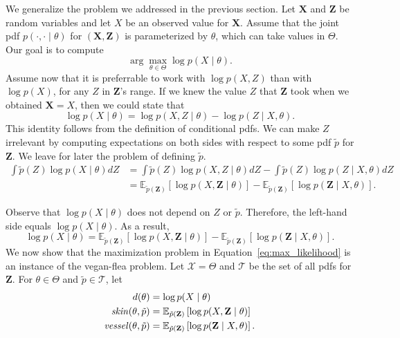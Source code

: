 We generalize the problem we addressed in the previous section. Let $\mathbf{X}$ and $\mathbf{Z}$ be random variables and let $X$ be an observed value for $\mathbf{X}$. Assume that the joint pdf $p(\cdot, \cdot \mid \theta)$ for $(\mathbf{X}, \mathbf{Z})$ is parameterized by $\theta$, which can take values in $\Theta$. Our goal is to compute
%
\begin{equation}
\arg\max_{\theta \in \Theta} \log p(X \mid \theta).
\label{eq:max_likelihood}
\end{equation}
%
Assume now that it is preferrable to work with $\log p\left(X, Z\right)$ than with $\log p(X)$, for any $Z$ in $\mathbf{Z}$'s range. If we knew the value $Z$ that $\mathbf{Z}$ took when we obtained $\mathbf{X} = X$, then we could state that
%
\begin{equation}
\log p(X \mid \theta) = \log p(X, Z \mid \theta) - \log p (Z \mid X, \theta).
\label{eq:connect}
\end{equation}
%
This identity follows from the definition of conditional pdfs. We can make $Z$ irrelevant by computing expectations on both sides with respect to some pdf $\tilde{p}$ for $\mathbf{Z}$. We leave for later the problem of defining $\tilde{p}$.
%
\begin{align*}
\int \tilde{p}(Z) \log p(X \mid \theta) dZ &= \int \tilde{p}(Z)\log p(X, Z \mid \theta) dZ - \int \tilde{p}(Z)\log p (Z \mid X, \theta) dZ\\[5pt]
&= \mathbb{E}_{\tilde{p}\left(\mathbf{Z}\right)}\left[\log p(X, \mathbf{Z} \mid \theta)\right] - \mathbb{E}_{\tilde{p}\left(\mathbf{Z}\right)}\left[\log p (\mathbf{Z} \mid X, \theta)\right].
\label{eq:log_connect} 
\end{align*}
%

Observe that $\log p(X \mid \theta)$ does not depend on $Z$ or $\tilde{p}$. Therefore, the left-hand side equals $\log p(X \mid \theta)$. As a result,
%
\begin{equation}
\log p(X \mid \theta) = \mathbb{E}_{\tilde{p}\left(\mathbf{Z}\right)}\left[\log p(X, \mathbf{Z} \mid \theta)\right] - \mathbb{E}_{\tilde{p}\left(\mathbf{Z}\right)}\left[\log p (\mathbf{Z} \mid X, \theta)\right].
\label{eq:log_expec_connect} 
\end{equation}
%
We now show that the maximization problem in Equation~\ref{eq:max_likelihood} is an instance of the vegan-flea problem. Let $\mathcal{X} = \Theta$ and $\mathcal{T}$ be the set of all pdfs for $\mathbf{Z}$. For $\theta \in \Theta$ and $\tilde{p} \in \mathcal{T}$, let 
%
\begin{align*}
d(\theta) &= \log p(X \mid \theta)\\
\mathit{skin}(\theta, \tilde{p}) &= \mathbb{E}_{\tilde{p}\left(\mathbf{Z}\right)}\left[\log p(X, \mathbf{Z} \mid \theta)\right]\\
\mathit{vessel}(\theta, \tilde{p}) &= \mathbb{E}_{\tilde{p}\left(\mathbf{Z}\right)}\left[\log p (\mathbf{Z} \mid X, \theta)\right].
\end{align*}

